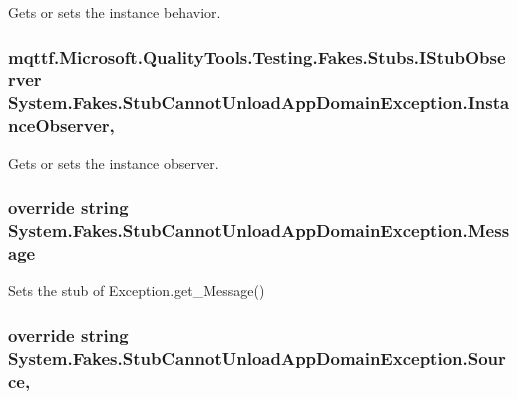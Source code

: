 Gets or sets the instance behavior.

\hypertarget{class_system_1_1_fakes_1_1_stub_cannot_unload_app_domain_exception_a9241dc880bfcbd056b32d988f8905644}{
\subsubsection[{Instance\-Observer}]{\setlength{\rightskip}{0pt plus 5cm}mqttf.\-Microsoft.\-Quality\-Tools.\-Testing.\-Fakes.\-Stubs.\-I\-Stub\-Observer System.\-Fakes.\-Stub\-Cannot\-Unload\-App\-Domain\-Exception.\-Instance\-Observer\hspace{0.3cm}{\ttfamily [get]}, {\ttfamily [set]}}}\label{class_system_1_1_fakes_1_1_stub_cannot_unload_app_domain_exception_a9241dc880bfcbd056b32d988f8905644}


Gets or sets the instance observer.

\hypertarget{class_system_1_1_fakes_1_1_stub_cannot_unload_app_domain_exception_a47ca558d7a0f3cb175179167edaaaaee}{
\subsubsection[{Message}]{\setlength{\rightskip}{0pt plus 5cm}override string System.\-Fakes.\-Stub\-Cannot\-Unload\-App\-Domain\-Exception.\-Message\hspace{0.3cm}{\ttfamily [get]}}}\label{class_system_1_1_fakes_1_1_stub_cannot_unload_app_domain_exception_a47ca558d7a0f3cb175179167edaaaaee}


Sets the stub of Exception.\-get\-\_\-\-Message()

\hypertarget{class_system_1_1_fakes_1_1_stub_cannot_unload_app_domain_exception_a63302ba312f46f1caa8a38bc32900112}{
\subsubsection[{Source}]{\setlength{\rightskip}{0pt plus 5cm}override string System.\-Fakes.\-Stub\-Cannot\-Unload\-App\-Domain\-Exception.\-Source\hspace{0.3cm}{\ttfamily [get]}, {\ttfamily [set]}}}\label{class_system_1_1_fakes_1_1_stub_cannot_unload_app_domain_exception_a63302ba312f46f1caa8a38bc32900112}


